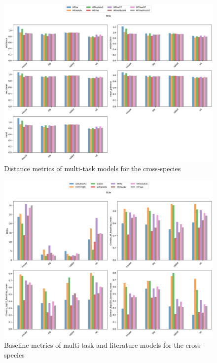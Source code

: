 \documentclass[12pt, a4paper]{article}
\begin{document}
\begin{figure}[h!]
    \centering
    \includegraphics[width=.85\textwidth]{multi_task_benchmarking_cell_type_distance_metrics_cross_species.png}
    \caption{Distance metrics of multi-task models for the cross-species}
\end{figure}

\begin{figure}[h!]
    \centering
    \includegraphics[width=.85\textwidth]{selected_benchmarking_cell_type_baseline_metrics_cross_species.png}
    \caption{Baseline metrics of multi-task and literature models for the cross-species}
    \label{}
\end{figure}
\end{document}
